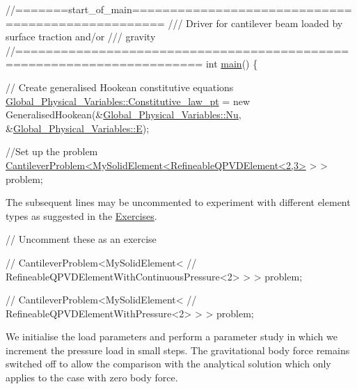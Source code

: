 
\begin{DoxyCodeInclude}
\textcolor{comment}{//=======start\_of\_main==================================================}
\textcolor{comment}{/// Driver for cantilever beam loaded by surface traction and/or}
\textcolor{comment}{}\textcolor{comment}{/// gravity}
\textcolor{comment}{}\textcolor{comment}{//======================================================================}
\textcolor{keywordtype}{int} \hyperlink{airy__cantilever_8cc_ae66f6b31b5ad750f1fe042a706a4e3d4}{main}()
\{

 \textcolor{comment}{// Create generalised Hookean constitutive equations}
 \hyperlink{namespaceGlobal__Physical__Variables_a5d5f19442938130d36ee7476ae25049c}{Global\_Physical\_Variables::Constitutive\_law\_pt} = 
  \textcolor{keyword}{new} GeneralisedHookean(&\hyperlink{namespaceGlobal__Physical__Variables_a3962c36313826b19f216f6bbbdd6a477}{Global\_Physical\_Variables::Nu},
                         &\hyperlink{namespaceGlobal__Physical__Variables_a09a019474b7405b35da2437f7779bc7e}{Global\_Physical\_Variables::E});
 
 \textcolor{comment}{//Set up the problem}
 \hyperlink{classCantileverProblem}{CantileverProblem<MySolidElement<RefineableQPVDElement<2,3>}
       > > problem;

\end{DoxyCodeInclude}


The subsequent lines may be uncommented to experiment with different element types as suggested in the \hyperlink{index_ex}{Exercises}.


\begin{DoxyCodeInclude}


 \textcolor{comment}{// Uncomment these as an exercise}

 \textcolor{comment}{// CantileverProblem<MySolidElement<}
 \textcolor{comment}{//  RefineableQPVDElementWithContinuousPressure<2> > > problem;}

 \textcolor{comment}{// CantileverProblem<MySolidElement<}
 \textcolor{comment}{//  RefineableQPVDElementWithPressure<2> > > problem;}

\end{DoxyCodeInclude}


We initialise the load parameters and perform a parameter study in which we increment the pressure load in small steps. The gravitational body force remains switched off to allow the comparison with the analytical solution which only applies to the case with zero body force.


